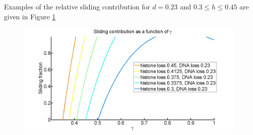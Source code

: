 \documentclass[12pt]{report}
\begin{document}
 Examples of the relative sliding contribution for $ d=0.23$ and $0.3\leq h\leq 0.45$ are given in Figure \ref{fig:relativeSlidingContribution}
  
\begin{figure}[H]
\centering
\includegraphics[width=0.5\linewidth, height=0.3\textheight]{../Images/SlidingModel/relativeSlidingContribution}
\caption{}
\label{fig:relativeSlidingContribution}
\end{figure}
\end{document}
